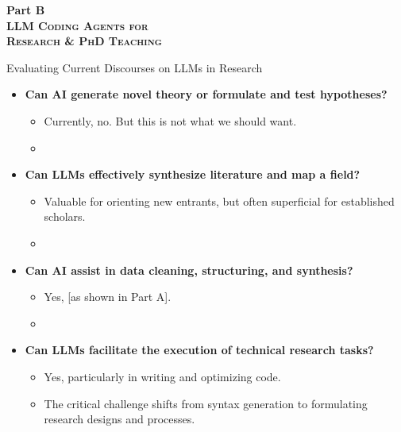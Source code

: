 \documentclass[xcolor=x11names,compress,9pt]{beamer}
\renewcommand{\(}{\begin{columns}}
\renewcommand{\)}{\end{columns}}
\newcommand{\<}[1]{\begin{column}{#1}}
\renewcommand{\>}{\end{column}}
\begin{document}
\begin{frame}
    \centering
    \vfill
    \Huge\bfseries Part B \\ 
    \vspace{0.4cm}
    \large\scshape LLM Coding Agents for \\ Research \& PhD Teaching
    \vfill
\end{frame}

\begin{frame}{Evaluating Current Discourses on LLMs in Research}
    \begin{itemize}
        \item \textbf{Can AI generate novel theory or formulate and test hypotheses?} 
        \begin{itemize}
            \item Currently, no. But this is not what we should want. 
            \item []
        \end{itemize}
        \item \textbf{Can LLMs effectively synthesize literature and map a field?} 
        \begin{itemize}
            \item Valuable for orienting new entrants, but often superficial for established scholars.
            \item []
        \end{itemize}
        \item \textbf{Can AI assist in data cleaning, structuring, and synthesis?} 
        \begin{itemize}
            \item Yes, [as shown in Part A].
            \item []
        \end{itemize}
        \item \textbf{Can LLMs facilitate the execution of technical research tasks?} 
        \begin{itemize}
            \item Yes, particularly in writing and optimizing code.
            \item The critical challenge shifts from syntax generation to formulating research designs and processes.
        \end{itemize}
    \end{itemize}
\end{frame}
\end{document}
